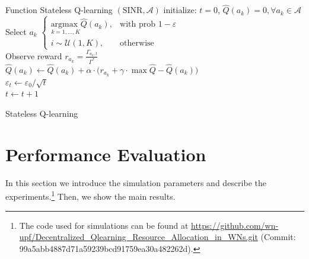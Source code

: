 \documentclass[conference]{IEEEtran}
\begin{document}
	\begin{algorithm}
		Function Stateless Q-learning $(\text{SINR},\mathcal{A})$\;
		initialize: $t=0$, $\hat{Q}(a_k) = 0, \forall a_k \in \mathcal{A}$\\
		{
			Select $a_k$  $\begin{cases}
			\underset{k=1,...,K}{\text{argmax }} \hat{Q}(a_k), & \text{with prob } 1 - \varepsilon\\
			i \sim \mathcal{U}(1, K), & \text{otherwise}
			\end{cases}$\\
			Observe reward $r_{a_k} = \frac{\Gamma_{a_k,t}}{\Gamma^*}$ \\
			$\hat{Q}(a_k) \leftarrow \hat{Q}(a_k) + \alpha \cdot \big(r_{a_k} + \gamma \cdot \max\hat{Q} - \hat{Q}(a_k)\big)$\\
			$\varepsilon_t \leftarrow \varepsilon_0 / \sqrt{t}$ \\	
			$ t \leftarrow t + 1$
		}
		\caption{Stateless Q-learning}
		\label{alg:qlearning}
	\end{algorithm}
	
	\section{Performance Evaluation}
	\label{section:performance_evaluation}	
	In this section we introduce the simulation parameters and describe the experiments.\footnote{The code used for simulations can be found at \url{https://github.com/wn-upf/Decentralized_Qlearning_Resource_Allocation_in_WNs.git} (Commit: 99a5abb4887d71a59239bcd91759ea30a482262d).} Then, we show the main results.
	
\end{document}
